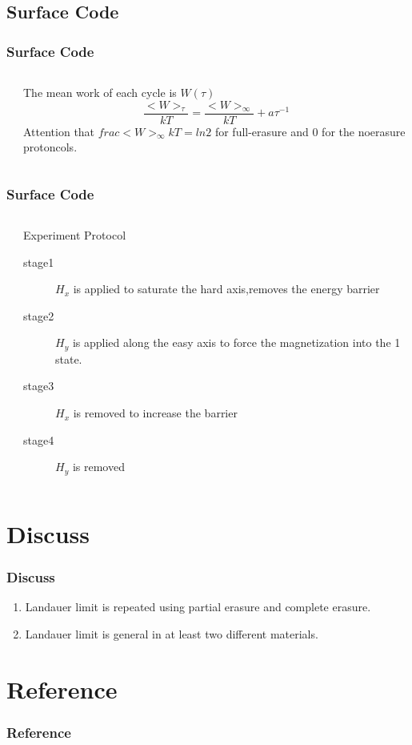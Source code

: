 \documentclass[aspectratio=169,10pt]{beamer}
\begin{document}
\subsection{Surface Code}
\begin{frame}
    \frametitle{Surface Code}
    \begin{columns}
        \begin{column}{0.5\textwidth}
            \centering
        \end{column}
        \begin{column}{0.5\textwidth}
            The mean work of each cycle is $W(\tau)$
            \[\frac{<W>_\tau}{kT}=\frac{<W>_\infty}{kT}+a\tau^{-1}\] 
            Attention that $frac{<W>_\infty}{kT}=ln2$ for full-erasure and 0 for the noerasure protoncols.
        \end{column}
    \end{columns}
\end{frame}
\begin{frame}
    \frametitle{Surface Code}
    \begin{columns}
        \begin{column}{0.5\textwidth}
            \centering
        \end{column}
        \begin{column}{0.5\textwidth}
            \centering
            \begin{block}{Experiment Protocol\cite{hong2016experimental}}
                \begin{description}
                    \item[stage1] $H_x$ is applied to saturate the hard axis,removes the energy barrier
                    \item[stage2] $H_y$ is applied along the easy axis to force the magnetization into the 1 state.
                    \item[stage3] $H_x$ is removed to increase the barrier
                    \item[stage4] $H_y$ is removed
                \end{description}
            \end{block}
        \end{column}
    \end{columns}
\end{frame}

\section{Discuss}
\begin{frame}
    \frametitle{Discuss}
    \begin{enumerate}
        \item Landauer limit is repeated using partial erasure and complete erasure.
        \item Landauer limit is general in at least two different materials.
    \end{enumerate}
\end{frame}
\section{Reference}
\begin{frame}[allowframebreaks]
    \frametitle{Reference}
    \printbibliography
\end{frame}
\begin{frame}
\end{frame}
\end{document}
